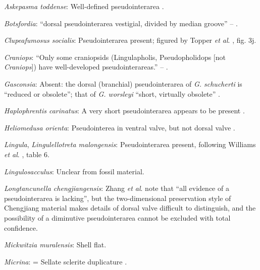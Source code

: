 \documentclass[openany]{book}
\theoremstyle{definition}
\theoremstyle{definition}
\theoremstyle{definition}
\theoremstyle{remark}
\begin{document}
\hypertarget{Askepasma_toddense-coding-22}{}
\emph{Askepasma toddense}: Well-defined pseudointerarea
\citep[p153]{Williams2000LinguliformeaCraniiformea}.

\hypertarget{Botsfordia-coding-22}{}
\emph{Botsfordia}: ``dorsal pseudointerarea vestigial, divided by median
groove'' -- \citet{Williams2000LinguliformeaCraniiformea}.

\hypertarget{Clupeafumosus_socialis-coding-22}{}
\emph{Clupeafumosus socialis}: Pseudointerarea present; figured by
Topper \emph{et al}. \citeyearpar{Topper2013Reappraisalof}, fig. 3j.

\hypertarget{Craniops-coding-22}{}
\emph{Craniops}: ``Only some craniopsids (Lingulapholis, Pseudopholidops
{[}not \emph{Craniops}{]}) have well-developed pseudointerareas.'' --
\citet{Williams2000LinguliformeaCraniiformea}.

\hypertarget{Gasconsia-coding-22}{}
\emph{Gasconsia}: Absent: the dorsal (branchial) pseudointerarea of
\emph{G. schucherti} is ``reduced or obsolete''; that of \emph{G.
worsleyi} ``short, virtually obsolete'' \citep{Hanken1985Thetaxonomy}.

\hypertarget{Haplophrentis_carinatus-coding-22}{}
\emph{Haplophrentis carinatus}: A very short pseudointerarea appears to
be present \citep{Moysiuk2017Hyolithsare}.

\hypertarget{Heliomedusa_orienta-coding-22}{}
\emph{Heliomedusa orienta}: Pseudointerea in ventral valve, but not
dorsal valve \citep[2007]{Williams2000LinguliformeaCraniiformea}.

\hypertarget{Lingula-coding-22}{}
\emph{Lingula}, \emph{Lingulellotreta malongensis}: Pseudointerarea
present, following Williams \emph{et al}.
\citeyearpar{Williams2000LinguliformeaCraniiformea}, table 6.

\hypertarget{Lingulosacculus-coding-22}{}
\emph{Lingulosacculus}: Unclear from fossil material.

\hypertarget{Longtancunella_chengjiangensis-coding-22}{}
\emph{Longtancunella chengjiangensis}: Zhang \emph{et al}.
\citeyearpar{Zhang2011Theexceptionally} note that ``all evidence of a
pseudointerarea is lacking'', but the two-dimensional preservation style
of Chengjiang material makes details of dorsal valve difficult to
distinguish, and the possibility of a diminutive pseudointerarea cannot
be excluded with total confidence.

\hypertarget{Mickwitzia_muralensis-coding-22}{}
\emph{Mickwitzia muralensis}: Shell flat.

\hypertarget{Micrina-coding-22}{}
\emph{Micrina}: = Sellate sclerite duplicature
\citep{Holmer2008TheEarly}.
\end{document}
